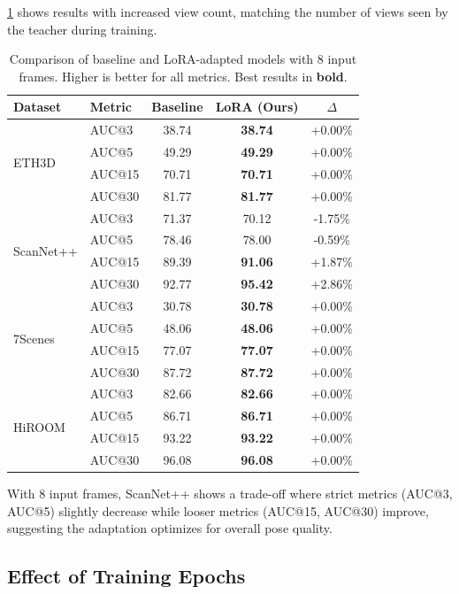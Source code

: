 \cref{tab:results_8frames} shows results with increased view count, matching the number of views seen by the teacher during training.

\begin{table}[t]
\centering
\caption{Comparison of baseline and LoRA-adapted models with 8 input frames. Higher is better for all metrics. Best results in \textbf{bold}.}
\label{tab:results_8frames}
\setlength{\tabcolsep}{4pt}
\begin{tabular}{@{}l l c c c@{}}
\toprule
Dataset & Metric & Baseline & LoRA (Ours) & $\Delta$ \\
\midrule
\multirow{4}{*}{ETH3D}
& AUC@3 & 38.74 & \textbf{38.74} & +0.00\% \\
& AUC@5 & 49.29 & \textbf{49.29} & +0.00\% \\
& AUC@15 & 70.71 & \textbf{70.71} & +0.00\% \\
& AUC@30 & 81.77 & \textbf{81.77} & +0.00\% \\
\midrule
\multirow{4}{*}{ScanNet++}
& AUC@3 & 71.37 & 70.12 & -1.75\% \\
& AUC@5 & 78.46 & 78.00 & -0.59\% \\
& AUC@15 & 89.39 & \textbf{91.06} & +1.87\% \\
& AUC@30 & 92.77 & \textbf{95.42} & +2.86\% \\
\midrule
\multirow{4}{*}{7Scenes}
& AUC@3 & 30.78 & \textbf{30.78} & +0.00\% \\
& AUC@5 & 48.06 & \textbf{48.06} & +0.00\% \\
& AUC@15 & 77.07 & \textbf{77.07} & +0.00\% \\
& AUC@30 & 87.72 & \textbf{87.72} & +0.00\% \\
\midrule
\multirow{4}{*}{HiROOM}
& AUC@3 & 82.66 & \textbf{82.66} & +0.00\% \\
& AUC@5 & 86.71 & \textbf{86.71} & +0.00\% \\
& AUC@15 & 93.22 & \textbf{93.22} & +0.00\% \\
& AUC@30 & 96.08 & \textbf{96.08} & +0.00\% \\
\bottomrule
\end{tabular}
\end{table}

With 8 input frames, ScanNet++ shows a trade-off where strict metrics (AUC@3, AUC@5) slightly decrease while looser metrics (AUC@15, AUC@30) improve, suggesting the adaptation optimizes for overall pose quality.

\subsection{Effect of Training Epochs}

